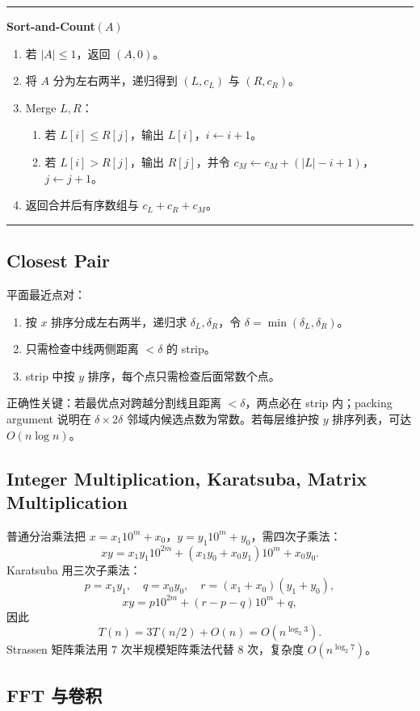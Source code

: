 \documentclass[UTF8,a4paper,11pt]{ctexart}
\newenvironment{algobox}[1]
{\par\medskip\noindent\begin{minipage}{0.96\linewidth}\hrule\vspace{0.35em}\textbf{#1}\par\vspace{0.25em}\small}
{\par\vspace{0.25em}\hrule\end{minipage}\par\medskip}
\begin{document}
\begin{algobox}{Sort-and-Count$(A)$}
\begin{enumerate}
  \item 若 $|A|\le 1$，返回 $(A,0)$。
  \item 将 $A$ 分为左右两半，递归得到 $(L,c_L)$ 与 $(R,c_R)$。
  \item Merge $L,R$：
  \begin{enumerate}
    \item 若 $L[i]\le R[j]$，输出 $L[i]$，$i\leftarrow i+1$。
    \item 若 $L[i]>R[j]$，输出 $R[j]$，并令 $c_M\leftarrow c_M+(|L|-i+1)$，$j\leftarrow j+1$。
  \end{enumerate}
  \item 返回合并后有序数组与 $c_L+c_R+c_M$。
\end{enumerate}
\end{algobox}

\subsection{Closest Pair}

平面最近点对：
\begin{enumerate}
  \item 按 $x$ 排序分成左右两半，递归求 $\delta_L,\delta_R$，令 $\delta=\min(\delta_L,\delta_R)$。
  \item 只需检查中线两侧距离 $<\delta$ 的 strip。
  \item strip 中按 $y$ 排序，每个点只需检查后面常数个点。
\end{enumerate}
正确性关键：若最优点对跨越分割线且距离 $<\delta$，两点必在 strip 内；packing argument 说明在 $\delta\times 2\delta$ 邻域内候选点数为常数。若每层维护按 $y$ 排序列表，可达 $O(n\log n)$。

\subsection{Integer Multiplication, Karatsuba, Matrix Multiplication}

普通分治乘法把 $x=x_1 10^m+x_0$，$y=y_1 10^m+y_0$，需四次子乘法：
\[
xy=x_1y_1 10^{2m}+(x_1y_0+x_0y_1)10^m+x_0y_0.
\]
Karatsuba 用三次子乘法：
\[
p=x_1y_1,\quad q=x_0y_0,\quad r=(x_1+x_0)(y_1+y_0),
\]
\[
xy=p10^{2m}+(r-p-q)10^m+q,
\]
因此
\[
T(n)=3T(n/2)+O(n)=O(n^{\log_2 3}).
\]
Strassen 矩阵乘法用 $7$ 次半规模矩阵乘法代替 $8$ 次，复杂度 $O(n^{\log_2 7})$。

\subsection{FFT 与卷积}
\end{document}

